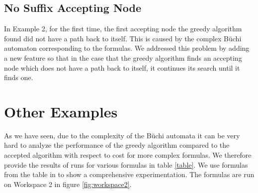 \subsection{No Suffix Accepting Node}
In Example 2, for the first time, the first accepting node the greedy algorithm found did not have a path back to itself. This is caused by the complex B\"uchi automaton corresponding to the formulas. We addressed this problem by adding a new feature so that in the case that the greedy algorithm finds an accepting node which does not have a path back to itself, it continues its search until it finds one. 

\section{Other Examples}
As we have seen, due to the complexity of the B\"uchi automata it can be very hard to analyze the performance of the greedy algorithm compared to the accepted algorithm with respect to cost for more complex formulas. We therefore provide the results of runs for various formulas in table \ref{table}. We use formulas from the table in \cite{somenzi00} to show a comprehensive experimentation. The formulas are run on Workspace 2 in figure \ref{fig:workspace2}. 

